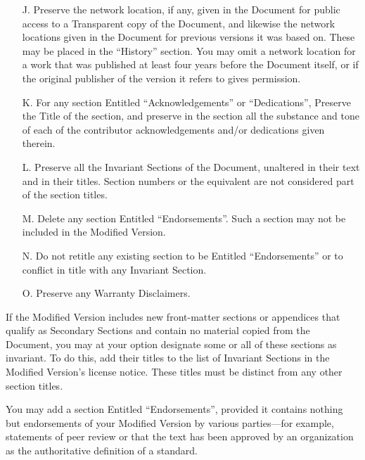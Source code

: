\begin{itemize}
\item[J.]
   Preserve the network location, if any, given in the Document for
   public access to a Transparent copy of the Document, and likewise
   the network locations given in the Document for previous versions
   it was based on.  These may be placed in the ``History'' section.
   You may omit a network location for a work that was published at
   least four years before the Document itself, or if the original
   publisher of the version it refers to gives permission.
   
\item[K.]
   For any section Entitled ``Acknowledgements'' or ``Dedications'',
   Preserve the Title of the section, and preserve in the section all
   the substance and tone of each of the contributor acknowledgements
   and/or dedications given therein.
   
\item[L.]
   Preserve all the Invariant Sections of the Document,
   unaltered in their text and in their titles.  Section numbers
   or the equivalent are not considered part of the section titles.
   
\item[M.]
   Delete any section Entitled ``Endorsements''.  Such a section
   may not be included in the Modified Version.
   
\item[N.]
   Do not retitle any existing section to be Entitled ``Endorsements''
   or to conflict in title with any Invariant Section.
   
\item[O.]
   Preserve any Warranty Disclaimers.
\end{itemize}
\fi

\ifdefined\chs

\fi

\ifdefined\eng
If the Modified Version includes new front-matter sections or
appendices that qualify as Secondary Sections and contain no material
copied from the Document, you may at your option designate some or all
of these sections as invariant.  To do this, add their titles to the
list of Invariant Sections in the Modified Version's license notice.
These titles must be distinct from any other section titles.
\fi

\ifdefined\chs

\fi

\ifdefined\eng
You may add a section Entitled ``Endorsements'', provided it contains
nothing but endorsements of your Modified Version by various
parties---for example, statements of peer review or that the text has
been approved by an organization as the authoritative definition of a
standard.
\fi

